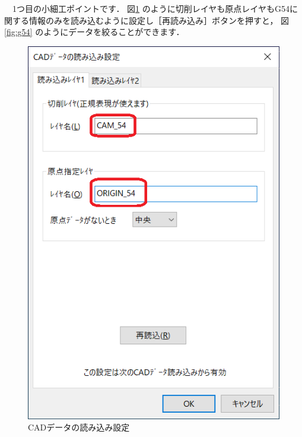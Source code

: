 

\vspace*{1zh}
　1つ目の小細工ポイントです．
図\ref{fig:setup} のように切削レイヤも原点レイヤもG54に関する情報のみを読み込むように設定し［再読み込み］ボタンを押すと，
図\ref{fig:g54} のようにデータを絞ることができます．

\begin{figure}[H]
\centering
\includegraphics[scale=0.7]{No3/fig/setup.png}
\caption{CADデータの読み込み設定}
\label{fig:setup}
\end{figure}

